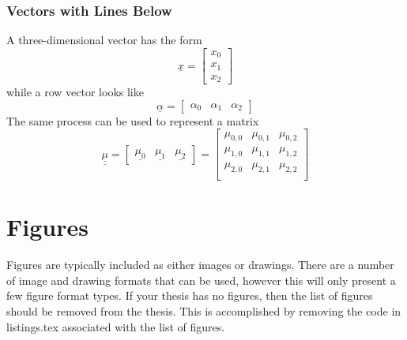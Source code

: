 \subsubsection{Vectors with Lines Below}
A three-dimensional vector has the form
\begin{equation}
	\underline{x}
	=\begin{bmatrix}
		x_0 \\ x_1 \\ x_2
	\end{bmatrix}
\end{equation}
while a row vector looks like
\begin{equation}
	\underline{\alpha}
	=\begin{bmatrix}
		\alpha_0 & \alpha_1 & \alpha_2
	\end{bmatrix}
\end{equation}
The same process can be used to represent a matrix
\begin{equation}
	\underline{\underline{\mu}}
	=\begin{bmatrix}
		\underline{\mu_0} & \underline{\mu_1} & \underline{\mu_2}
	\end{bmatrix}
	=\begin{bmatrix}
		\mu_{0,0} & \mu_{0,1} & \mu_{0,2} \\
		\mu_{1,0} & \mu_{1,1} & \mu_{1,2} \\
		\mu_{2,0} & \mu_{2,1} & \mu_{2,2} \\
	\end{bmatrix}
\end{equation}

\section{Figures} \label{sec:Figures}
Figures are typically included as either images or drawings.
There are a number of image and drawing formats that can be used, however this will only present a few figure format types.
If your thesis has no figures, then the list of figures should be removed from the thesis.
This is accomplished by removing the code in listings.tex associated with the list of figures.

